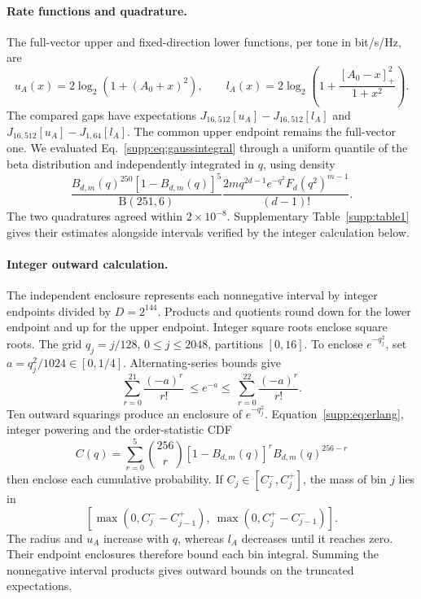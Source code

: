 \paragraph{Rate functions and quadrature.}
The full-vector upper and fixed-direction lower functions, per tone in bit/s/Hz, are
\begin{equation}
 u_A(x)=2\log_2\!\left(1+(A_0+x)^2\right),\qquad
 l_A(x)=2\log_2\!\left(1+\frac{[A_0-x]_+^2}{1+x^2}\right).
 \label{supp:eq:gaussrates}
\end{equation}
The compared gaps have expectations \(J_{16,512}[u_A]-J_{16,512}[l_A]\) and
\(J_{16,512}[u_A]-J_{1,64}[l_A]\). The common upper endpoint remains the full-vector one. We evaluated Eq.~\eqref{supp:eq:gaussintegral} through a uniform quantile of the beta distribution and independently integrated in \(q\), using density
\begin{equation}
 \frac{B_{d,m}(q)^{250}[1-B_{d,m}(q)]^5}{\mathrm B(251,6)}
 \frac{2m q^{2d-1}e^{-q^2}F_d(q^2)^{m-1}}{(d-1)!}.
\end{equation}
The two quadratures agreed within \(2\times10^{-8}\). Supplementary Table~\ref{supp:table1} gives their estimates alongside intervals verified by the integer calculation below.

\paragraph{Integer outward calculation.}
The independent enclosure represents each nonnegative interval by integer endpoints divided by \(D=2^{144}\). Products and quotients round down for the lower endpoint and up for the upper endpoint. Integer square roots enclose square roots. The grid \(q_j=j/128\), \(0\leq j\leq2048\), partitions \([0,16]\). To enclose \(e^{-q_j^2}\), set \(a=q_j^2/1024\in[0,1/4]\). Alternating-series bounds give
\begin{equation}
 \sum_{r=0}^{21}\frac{(-a)^r}{r!}
 \ \leq e^{-a}\leq\
 \sum_{r=0}^{22}\frac{(-a)^r}{r!}.
\end{equation}
Ten outward squarings produce an enclosure of \(e^{-q_j^2}\). Equation~\eqref{supp:eq:erlang}, integer powering and the order-statistic CDF
\begin{equation}
 C(q)=\sum_{r=0}^{5}\binom{256}{r}
       [1-B_{d,m}(q)]^r B_{d,m}(q)^{256-r}
 \label{supp:eq:ordercdf}
\end{equation}
then enclose each cumulative probability. If \(C_j\in[C_j^-,C_j^+]\), the mass of bin \(j\) lies in
\[
 \left[\max(0,C_j^--C_{j-1}^+),\
       \max(0,C_j^+-C_{j-1}^-)\right].
\]
The radius and \(u_A\) increase with \(q\), whereas \(l_A\) decreases until it reaches zero. Their endpoint enclosures therefore bound each bin integral. Summing the nonnegative interval products gives outward bounds on the truncated expectations.

